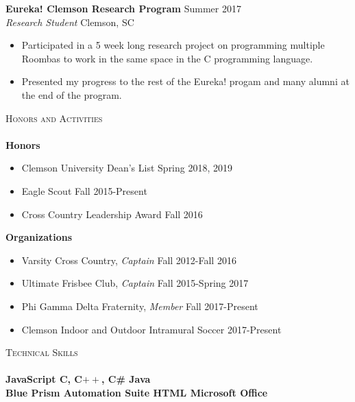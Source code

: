 \documentclass[a4paper]{article}
\newcommand{\lineunder} {
    \vspace*{-8pt} \\
    \hspace*{-18pt} \hrulefill \\
}
\newcommand{\header} [1] {
    {\hspace*{-18pt}\vspace*{6pt} \textsc{#1}}
    \vspace*{-6pt} \lineunder
}
\newcommand{\beginninglist} [4] {
	
	\noindent \textbf{#1} \hfill \hfill #3\\ \noindent \textit{#2} \hfill \hfill #4 \\    
}
\begin{document}
\beginninglist {Eureka! Clemson Research Program} {Research Student} {Summer 2017} {Clemson, SC}
\vspace{-8pt}
\begin{itemize}
	\item Participated in a 5 week long research project on programming multiple Roombas to work in the same space in the C programming language.  \vspace{-5pt}
	\item Presented my progress to the rest of the Eureka! progam and many alumni at the end of the program. \vspace{-5pt}
\end{itemize}

\header {Honors and Activities}

\textbf{Honors}

\begin{itemize}
\vspace{-10pt}
\item Clemson University Dean's List \hfill \hfill Spring 2018, 2019 \vspace{-5pt} 
\item Eagle Scout \hfill \hfill Fall 2015-Present \vspace{-5pt}
\item Cross Country Leadership Award \hfill \hfill Fall 2016 \vspace{-5pt}
\end{itemize}

\textbf{Organizations} \vspace{-5pt}

\begin{itemize}
\item Varsity Cross Country, \textit{Captain} \hfill \hfill Fall 2012-Fall 2016 \vspace{-5pt} 
\item Ultimate Frisbee Club, \textit{Captain} \hfill \hfill Fall 2015-Spring 2017 \vspace{-5pt}  
\item Phi Gamma Delta Fraternity, \textit{Member} \hfill \hfill Fall 2017-Present \vspace{-5pt} 
\item Clemson Indoor and Outdoor Intramural Soccer \hfill \hfill 2017-Present \vspace{-5pt} 
\end{itemize}
\header {Technical Skills} 
\textbf{JavaScript \hspace{130pt}   C, C$++$, C\# \hspace{155pt} Java} \\
\textbf{Blue Prism Automation Suite \hspace{49pt} HTML \hspace{111pt} Microsoft Office}
\end{document}
